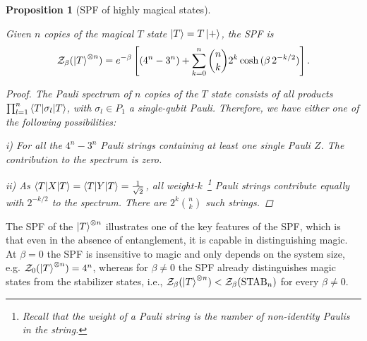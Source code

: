 \documentclass[aps,pra,superscriptaddress,twocolumn,longbibliography]{revtex4-2}
\newtheorem{proposition}{Proposition}
\begin{document}
\begin{proposition}[SPF of highly magical states]\label{Prop:T_ncopy-Pauli}

Given $n$ copies of the magical $T$ state $\ket{T}=T\ket{+}$, the SPF is 
%
\begin{equation*}
\mathcal{Z}_{\beta}(\ket{T}^{\otimes n})=e^{-\beta}\left[(4^{n}-3^{n})+\sum_{k=0}^{n}\binom{n}{k}2^{k}\cosh{(\beta\,2^{-k/2}) }\right].
\end{equation*}
%
\begin{proof}
The Pauli spectrum of $n$ copies of the $T$ state consists of all products $\prod_{l=1}^{n}\braket{T|\sigma_{l}|T}$, with $\sigma_{l} \in P_{1}$ a single-qubit Pauli. Therefore, we have either one of the following possibilities:

\vspace{2mm}

i) For all the $4^{n}-3^{n}$ Pauli strings containing at least one single Pauli $Z$. The contribution to the spectrum is zero.

\vspace{2mm}

ii) As $\braket{T|X|T}=\braket{T|Y|T}=\frac{1}{\sqrt{2}}$, all weight-$k$~\footnote{Recall that the weight of a Pauli string is the number of non-identity Paulis in the string.} Pauli strings contribute equally with $2^{-k/2}$ to the spectrum. There are $2^{k}\binom{n}{k}$ such strings.
    
\end{proof}
\end{proposition}

The SPF of the $\ket{T}^{\otimes n}$ illustrates one of the key features of the SPF, which is that even in the absence of entanglement, it is capable in distinguishing magic. 
At $\beta=0$ the SPF is insensitive to magic and only depends on the system size, {e.g.} $\mathcal{Z}_{0}(\ket{T}^{\otimes n})=4^{n}$, whereas for $\beta \neq 0$ the SPF already distinguishes magic states from the stabilizer states, i.e., $\mathcal{Z}_{\beta}(\ket{T}^{\otimes n})<\mathcal{Z}_{\beta}(\mathrm{STAB}_n)$ for every $\beta \neq 0$.
\end{document}
